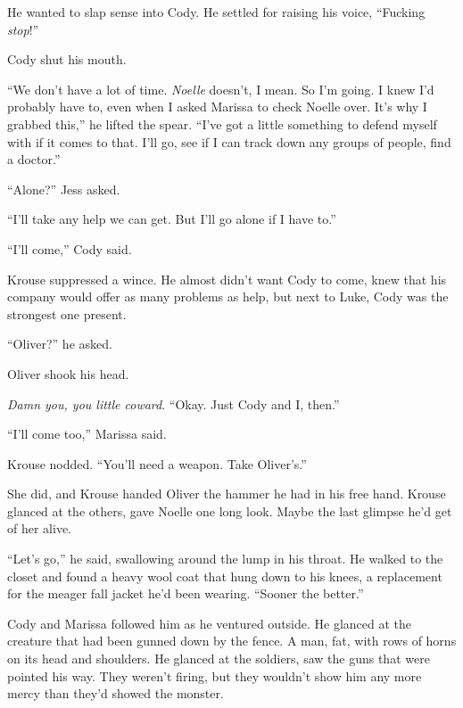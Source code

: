 He wanted to slap sense into Cody.  He settled for raising his voice, ``Fucking \emph{stop}!''



Cody shut his mouth.



``We don't have a lot of time.  \emph{Noelle} doesn't, I mean.  So I'm going.  I knew I'd probably have to, even when I asked Marissa to check Noelle over.  It's why I grabbed this,'' he lifted the spear.  ``I've got a little something to defend myself with if it comes to that.  I'll go, see if I can track down any groups of people, find a doctor.''



``Alone?'' Jess asked.



``I'll take any help we can get.  But I'll go alone if I have to.''



``I'll come,'' Cody said.



Krouse suppressed a wince.  He almost didn't want Cody to come, knew that his company would offer as many problems as help, but next to Luke, Cody was the strongest one present.



``Oliver?'' he asked.



Oliver shook his head.



\emph{Damn you, you little coward}.  ``Okay.  Just Cody and I, then.''



``I'll come too,'' Marissa said.



Krouse nodded.  ``You'll need a weapon.  Take Oliver's.''



She did, and Krouse handed Oliver the hammer he had in his free hand.  Krouse glanced at the others, gave Noelle one long look.  Maybe the last glimpse he'd get of her alive.



``Let's go,'' he said, swallowing around the lump in his throat.  He walked to the closet and found a heavy wool coat that hung down to his knees, a replacement for the meager fall jacket he'd been wearing.  ``Sooner the better.''



Cody and Marissa followed him as he ventured outside.  He glanced at the creature that had been gunned down by the fence.  A man, fat, with rows of horns on its head and shoulders.  He glanced at the soldiers, saw the guns that were pointed his way.  They weren't firing, but they wouldn't show him any more mercy than they'd showed the monster.



